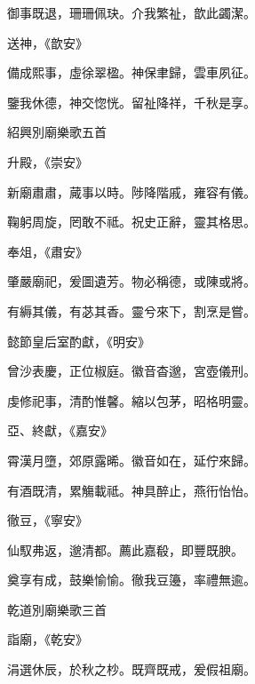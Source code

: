 \begin{pinyinscope}
 御事既退，珊珊佩玦。介我繁祉，歆此蠲潔。



 送神，《歆安》



 備成熙事，虛徐翠楹。神保聿歸，雲車夙征。



 鑒我休德，神交惚恍。留祉降祥，千秋是享。



 紹興別廟樂歌五首



 升殿，《崇安》



 新廟肅肅，蕆事以時。陟降階戚，雍容有儀。



 鞠躬周旋，罔敢不祗。祝史正辭，靈其格思。



 奉俎，《肅安》



 肇嚴廟祀，爰圖遺芳。物必稱德，或陳或將。



 有縟其儀，有苾其香。靈兮來下，割烹是嘗。



 懿節皇后室酌獻，《明安》



 曾沙表慶，正位椒庭。徽音杳邈，宮壺儀刑。



 虔修祀事，清酌惟馨。縮以包茅，昭格明靈。



 亞、終獻，《嘉安》



 霄漢月墮，郊原露晞。徽音如在，延佇來歸。



 有酒既清，累觴載祗。神具醉止，燕衎怡怡。



 徹豆，《寧安》



 仙馭弗返，邈清都。薦此嘉殽，即豐既腴。



 奠享有成，鼓樂愉愉。徹我豆籩，率禮無逾。



 乾道別廟樂歌三首



 詣廟，《乾安》



 涓選休辰，於秋之杪。既齊既戒，爰假祖廟。




\end{pinyinscope}
